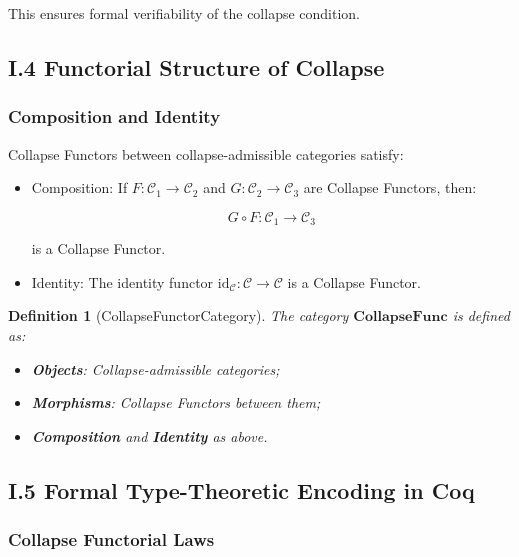 \documentclass[11pt]{article}
\newtheorem{definition}[theorem]{Definition}
\begin{document}
This ensures formal verifiability of the collapse condition.

\subsection*{I.4 Functorial Structure of Collapse}

\subsubsection*{Composition and Identity}

Collapse Functors between collapse-admissible categories satisfy:

\begin{itemize}
    \item Composition: If \( F : \mathcal{C}_1 \to \mathcal{C}_2 \) and \( G : \mathcal{C}_2 \to \mathcal{C}_3 \) are Collapse Functors, then:

\[
G \circ F : \mathcal{C}_1 \to \mathcal{C}_3
\]

is a Collapse Functor.

    \item Identity: The identity functor \( \mathrm{id}_{\mathcal{C}} : \mathcal{C} \to \mathcal{C} \) is a Collapse Functor.
\end{itemize}

\begin{definition}[CollapseFunctorCategory]
The category \( \mathbf{CollapseFunc} \) is defined as:

\begin{itemize}
    \item \textbf{Objects}: Collapse-admissible categories;
    \item \textbf{Morphisms}: Collapse Functors between them;
    \item \textbf{Composition} and \textbf{Identity} as above.
\end{itemize}
\end{definition}

\subsection*{I.5 Formal Type-Theoretic Encoding in Coq}

\subsubsection*{Collapse Functorial Laws}
\end{document}
